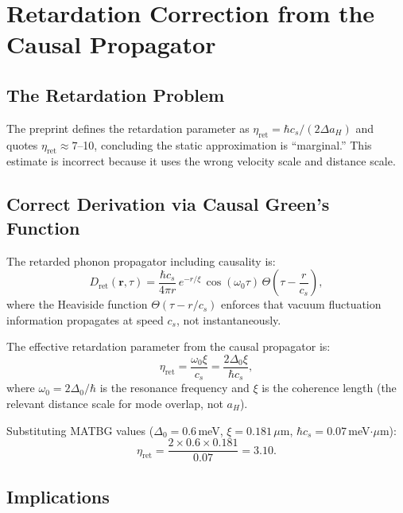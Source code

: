 \documentclass[11pt,letterpaper]{article}
\begin{document}
\section{Retardation Correction from the Causal Propagator}
\label{sec:retardation}

\subsection{The Retardation Problem}

The preprint defines the retardation parameter as $\eta_{\text{ret}} = \hbar c_s / (2\Delta a_H)$ and quotes $\eta_{\text{ret}} \approx 7$--10, concluding the static approximation is ``marginal.'' This estimate is incorrect because it uses the wrong velocity scale and distance scale.

\subsection{Correct Derivation via Causal Green's Function}

The retarded phonon propagator including causality is:
\begin{equation}
D_{\text{ret}}(\mathbf{r}, \tau) = \frac{\hbar c_s}{4\pi r}\, e^{-r/\xi}\, \cos(\omega_0 \tau)\, \Theta\!\left(\tau - \frac{r}{c_s}\right),
\end{equation}
where the Heaviside function $\Theta(\tau - r/c_s)$ enforces that vacuum fluctuation information propagates at speed $c_s$, not instantaneously.

The effective retardation parameter from the causal propagator is:
\begin{equation}
\eta_{\text{ret}} = \frac{\omega_0 \xi}{c_s} = \frac{2\Delta_0 \xi}{\hbar c_s},
\end{equation}
where $\omega_0 = 2\Delta_0/\hbar$ is the resonance frequency and $\xi$ is the coherence length (the relevant distance scale for mode overlap, not $a_H$).

Substituting MATBG values ($\Delta_0 = 0.6$\,meV, $\xi = 0.181\,\mu$m, $\hbar c_s = 0.07$\,meV$\cdot\mu$m):
\begin{equation}
\boxed{\eta_{\text{ret}} = \frac{2 \times 0.6 \times 0.181}{0.07} = 3.10.}
\label{eq:eta_ret_corrected}
\end{equation}

\subsection{Implications}
\end{document}

